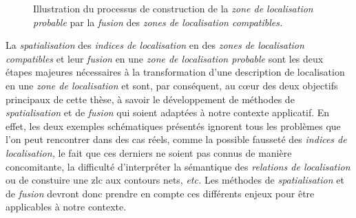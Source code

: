 \begin{figure}
  \centering
  
  \caption{Illustration du processus de construction de la \emph{zone
      de localisation probable} par la \emph{fusion} des \emph{zones
      de localisation compatibles.}}
  \label{fig:obj_fus}
\end{figure}

La \emph{spatialisation} des \emph{indices de localisation} en des
\emph{zones de localisation compatibles} et leur \emph{fusion} en une
\emph{zone de localisation probable} sont les deux étapes majeures
nécessaires à la transformation d'une description de localisation en
une \emph{zone de localisation} et sont, par conséquent, au cœur des
deux objectifs principaux de cette thèse, à savoir le développement de
méthodes de \emph{spatialisation} et de \emph{fusion} qui soient
adaptées à notre contexte applicatif. En effet, les deux exemples
schématiques présentés ignorent tous les problèmes que l'on peut
rencontrer dans des cas réels, comme la possible fausseté des
\emph{indices de localisation,} le fait que ces derniers ne soient pas
connus de manière concomitante, la difficulté d'interpréter la
sémantique des \emph{relations de localisation} ou de constuire une
\ac{zlc} aux contours nets, \emph{etc.} Les méthodes de
\emph{spatialisation} et de \emph{fusion} devront donc prendre en
compte ces différents enjeux pour être applicables à notre contexte.


